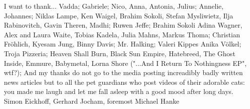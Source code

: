 I want to thank...
Vadda; Gabriele; Nico, Anna, Antonia, Julius; Annelie, Johannes;
%
Niklas Lampe, Ken Waigel, Brahim Sokoli, Stefan Mysliwietz, Ilja Rabinovitch,
Gavin Theren, Madhi; Ruwen Jeffe; Brahim Sokoli
Adina Wagner, Alex and Laura Waite, Tobias Kadela, Julia Mahns, Markus Thoma;
Christian Fröhlich, Kyesam Jung, Binny Davis;
Mr. Halking; Valeri Kippes
Anika Völkel;
Troja Pizzeria;
Heaven Shall Burn, Black Sun Empire, Hatebreed, The Ghost Inside, Emmure,
Babymetal, Lorna Shore ("...And I Return To Nothingness EP", wtf?);
%
And my thanks do not go to the media posting increadibly badly written news articles
but to all the pet guardians who post videos of their adorable cats: you made
me laugh and let me fall asleep with a good mood after long days.
Simon Eickhoff, Gerhard Jocham, foremost Michael Hanke
%

